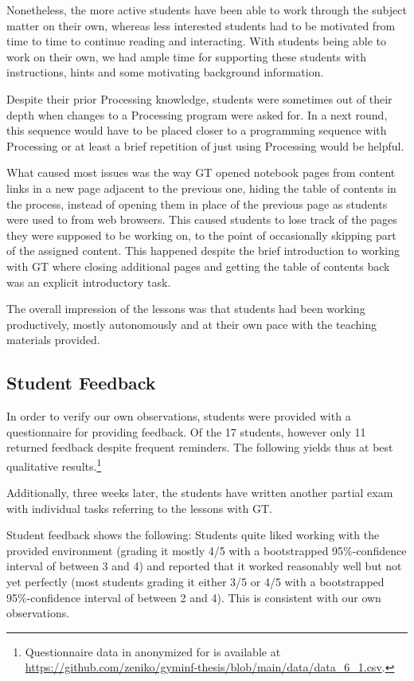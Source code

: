 Nonetheless, the more active students have been able to work through the subject matter on their own, whereas less interested students had to be motivated from time to time to continue reading and interacting. With students being able to work on their own, we had ample time for supporting these students with instructions, hints and some motivating background information.

Despite their prior Processing knowledge, students were sometimes out of their depth when changes to a Processing program were asked for. In a next round, this sequence would have to be placed closer to a programming sequence with Processing or at least a brief repetition of just using Processing would be helpful.

What caused most issues was the way \ac{GT} opened notebook pages from content links in a new page adjacent to the previous one, hiding the table of contents in the process, instead of opening them in place of the previous page as students were used to from web browsers. This caused students to lose track of the pages they were supposed to be working on, to the point of occasionally skipping part of the assigned content. This happened despite the brief introduction to working with \ac{GT} where closing additional pages and getting the table of contents back was an explicit introductory task.

The overall impression of the lessons was that students had been working productively, mostly autonomously and at their own pace with the teaching materials provided.


\subsection{Student Feedback}

In order to verify our own observations, students were provided with a questionnaire for providing feedback. Of the 17 students, however only 11 returned feedback despite frequent reminders. The following yields thus at best qualitative results.\footnote{Questionnaire data in anonymized for is available at \url{https://github.com/zeniko/gyminf-thesis/blob/main/data/data_6_1.csv}.}

Additionally, three weeks later, the students have written another partial exam with individual tasks referring to the lessons with \ac{GT}.

Student feedback shows the following: Students quite liked working with the provided environment (grading it mostly 4/5 with a bootstrapped 95\%-confidence interval of between 3 and 4) and reported that it worked reasonably well but not yet perfectly (most students grading it either 3/5 or 4/5 with a bootstrapped 95\%-confidence interval of between 2 and 4). This is consistent with our own observations.

